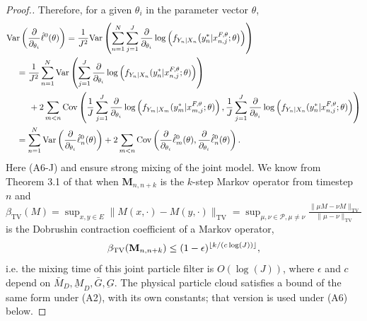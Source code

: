 \begin{proof}[Proof.]
Therefore, for a given $\theta_i$ in the parameter vector $\theta$,
\begin{align}
    \Var\left(\frac{\partial}{\partial_{\theta_i}} \hat\ell^0(\theta)\right) &= \frac{1}{J^2}\Var\left(\sum_{n=1}^N\sum_{j=1}^{J}\frac{\partial}{\partial_{\theta_i}} \log\left(f_{Y_n|X_{n}}\big(y_n^*|x_{n,j}^{F, \theta}; \theta\big)\right)\right) \\
    & \hspace{-20mm}= \frac{1}{J^2}\sum_{n=1}^N\Var\left(\sum_{j=1}^{J}\frac{\partial}{\partial_{\theta_i}} \log\left(f_{Y_n|X_{n}}(y_n^*|x_{n,j}^{F, \theta}; \theta)\right)\right)
\nonumber \\
    &\hspace{-15mm}+ 2\sum_{m<n}\Cov\left(\frac{1}{J}\sum_{j=1}^{J}\frac{\partial}{\partial_{\theta_i}} \log\left(f_{Y_m|X_{m}}(y_m^*|x_{m,j}^{F, \theta}; \theta)\right), \frac{1}{J}\sum_{j=1}^{J}\frac{\partial}{\partial_{\theta_i}} \log\left(f_{Y_n|X_{n}}(y_n^*|x_{n,j}^{F, \theta}; \theta)\right)\right)
\nonumber \\
    &\hspace{-20mm}= \sum_{n=1}^N \Var\left(\frac{\partial}{\partial_{\theta_i}}\hat\ell_n^0(\theta)\right) + 2\sum_{m<n} \Cov\left(\frac{\partial}{\partial_{\theta_i}}\hat\ell_m^0(\theta),\frac{\partial}{\partial_{\theta_i}}\hat\ell_n^0(\theta)\right).
\end{align}
Here (A6-J) and {} ensure strong mixing
of the joint model. We know from Theorem 3.1 of \cite{karjalainen23} that when $\textbf{M}_{n,n+k}$ is the $k$-step Markov operator from timestep $n$ and $\beta_{\text{TV}}(M) = \sup _{x, y \in E}\|M(x, \cdot)-M(y, \cdot)\|_{\mathrm{TV}}=\sup _{\mu, \nu \in \mathcal{P}, \mu \neq \nu} \frac{\|\mu M-\nu M\|_{\mathrm{TV}}}{\|\mu-\nu\|_{\mathrm{TV}}}$ is the Dobrushin contraction coefficient of a Markov operator,
\begin{equation}
\beta_{\text{TV}}(\textbf{M}_{n,n+k}) \leq (1-\epsilon)^{\lfloor k/(c\log(J)) \rfloor},
\end{equation}
i.e. the mixing time of this joint particle filter is $O(\log(J))$,
where $\epsilon$ and $c$ depend on $\bar M_D,\underbar M_D,\bar G,\underbar G$.
The physical particle cloud satisfies a bound of the same form under
(A2), with its own constants; that version is used under (A6) below.



\end{proof}
